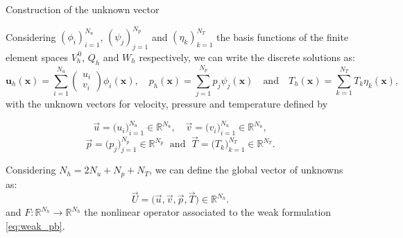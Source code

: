 

\begin{appendixframe}{Construction of the unknown vector}

	Considering $(\phi_i)_{i=1}^{N_u}$, $(\psi_j)_{j=1}^{N_p}$ and $(\eta_k)_{k=1}^{N_T}$ the basis functions of the finite element spaces $V_h^{\, 0}$, $Q_h$ and $W_h$ respectively, we can write the discrete solutions as:
	\begin{equation*}
		\bm{u}_h(\bm{x}) = \sum_{i=1}^{N_u} \begin{pmatrix}
			u_i \\
			v_i
		\end{pmatrix} \phi_i(\bm{x}), \quad p_h(\bm{x}) = \sum_{j=1}^{N_p} p_j \psi_j(\bm{x}) \quad \text{and} \quad T_h(\bm{x}) = \sum_{k=1}^{N_T} T_k \eta_k(\bm{x}),
	\end{equation*}	
	with the unknown vectors for velocity, pressure and temperature defined by

	\vspace{-5pt}
	$$\vec{u} = \big(u_i\big)_{i=1}^{N_u} \in \mathbb{R}^{N_u}, \quad \vec{v} = \big(v_i\big)_{i=1}^{N_u} \in \mathbb{R}^{N_u},$$
	$$\vec{p} = \big(p_j\big)_{j=1}^{N_p} \in \mathbb{R}^{N_p} \; \text{ and } \; \vec{T} = \big(T_k\big)_{k=1}^{N_T} \in \mathbb{R}^{N_T}.$$

	\vspace{5pt}
	Considering $N_h = 2N_u + N_p + N_T$, we can define the global vector of unknowns as:
	\begin{equation*}
		\vec{U} = \big(\vec{u}, \vec{v}, \vec{p}, \vec{T}) \in \mathbb{R}^{N_h}.
	\end{equation*}
	and $F:\mathbb{R}^{N_h} \to \mathbb{R}^{N_h}$ the nonlinear operator associated to the weak formulation \eqref{eq:weak_pb}.
\end{appendixframe}